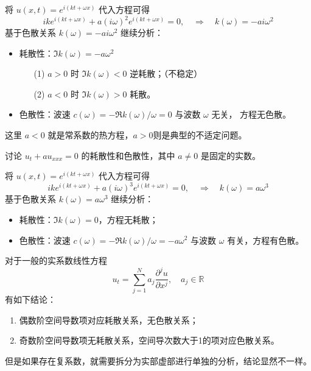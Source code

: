 \begin{solution*}
    将 $u(x,t) = e^{i(k t+\omega x)}$ 代入方程可得
    \[
        i k e^{i(k t+\omega x)} + a (i \omega)^2 e^{i(k t+\omega x)} = 0,
        \quad \Rightarrow \quad
        k(\omega) = - a i \omega^2
    \]
    基于色散关系 $k(\omega) = -a i \omega^2$ 继续分析：
    \begin{itemize}
        \item 耗散性：$\Im k(\omega) = -a \omega^2$
              \begin{itemize}
                  \item[(1)] $a>0$ 时 $\Im k(\omega) <0$ 逆耗散；（不稳定）
                  \item[(2)] $a<0$ 时 $\Im k(\omega) >0$ 耗散。
              \end{itemize}
        \item 色散性：波速 $c(\omega) = - \Re k(\omega) / \omega = 0$ 与波数 $\omega$ 无关，
              方程无色散。
    \end{itemize}
    这里 $a < 0$ 就是常系数的热方程，$a > 0$则是典型的不适定问题。
\end{solution*}


\begin{example}
    讨论 $u_t + a u_{xxx} = 0$ 的耗散性和色散性，其中 $a \neq 0 $ 是固定的实数。
\end{example}

\begin{solution*}
    将 $u(x,t) = e^{i(k t+\omega x)}$ 代入方程可得
    \[
        i k e^{i(k t+\omega x)} + a (i \omega)^3 e^{i(k t+\omega x)} = 0,
        \quad \Rightarrow \quad
        k(\omega) = a \omega^3
    \]
    基于色散关系 $k(\omega) = a \omega^3$ 继续分析：
    \begin{itemize}
        \item 耗散性：$\Im k(\omega) = 0$，方程无耗散；
        \item 色散性：波速 $c(\omega) = - \Re k(\omega) / \omega = - a \omega^2$ 与波数 $\omega$ 有关，方程有色散。
    \end{itemize}
\end{solution*}

对于一般的实系数线性方程
\[
    u_t = \sum_{j=1}^N a_j \frac{\partial^j u}{\partial x^j},\quad a_j \in \mathbb{R}
\]
有如下结论：
\begin{enumerate}
    \item 偶数阶空间导数项对应耗散关系，无色散关系；
    \item 奇数阶空间导数项无耗散关系，空间导次数大于1的项对应色散关系。
\end{enumerate}
但是如果存在复系数，就需要拆分为实部虚部进行单独的分析，结论显然不一样。

